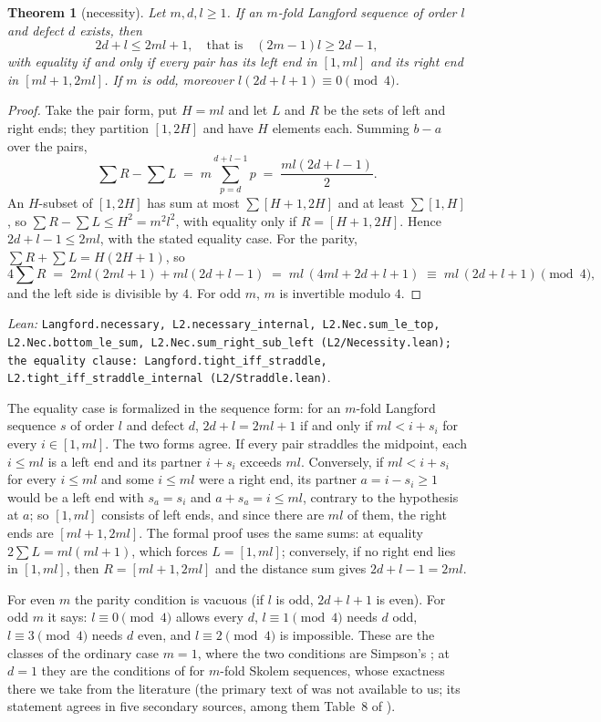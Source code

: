 \documentclass[11pt]{amsart}
\theoremstyle{plain}
\newtheorem{theorem}{Theorem}[section]
\theoremstyle{definition}
\theoremstyle{remark}
\newcommand{\lean}[1]{\par\smallskip
  {\small\raggedright\noindent\textit{Lean:} \texttt{#1}.\par}\smallskip}
\begin{document}
\begin{theorem}[necessity]\label{thm:nec}
Let $m, d, l \ge 1$. If an $m$-fold Langford sequence of order $l$ and defect $d$ exists,
then
\[
  2d + l \le 2ml + 1, \quad\text{that is}\quad (2m-1)l \ge 2d-1,
\]
with equality if and only if every pair has its left end in $[1,ml]$ and its right end in
$[ml+1,2ml]$. If $m$ is odd, moreover $l(2d+l+1) \equiv 0 \pmod 4$.
\end{theorem}

\begin{proof}
Take the pair form, put $H = ml$ and let $L$ and $R$ be the sets of left and right ends;
they partition $[1,2H]$ and have $H$ elements each. Summing $b - a$ over the pairs,
\[
  \sum R - \sum L \;=\; m \sum_{p=d}^{d+l-1} p \;=\; \frac{ml(2d+l-1)}{2}.
\]
An $H$-subset of $[1,2H]$ has sum at most $\sum[H+1,2H]$ and at least $\sum[1,H]$, so
$\sum R - \sum L \le H^2 = m^2l^2$, with equality only if $R = [H+1,2H]$. Hence
$2d + l - 1 \le 2ml$, with the stated equality case. For the parity,
$\sum R + \sum L = H(2H+1)$, so
\[
  4 \sum R \;=\; 2ml(2ml+1) + ml(2d+l-1) \;=\; ml\,(4ml + 2d + l + 1)
  \;\equiv\; ml\,(2d+l+1) \pmod 4,
\]
and the left side is divisible by $4$. For odd $m$, $m$ is invertible modulo $4$.
\end{proof}
\lean{Langford.necessary, L2.necessary\_internal, L2.Nec.sum\_le\_top,
L2.Nec.bottom\_le\_sum, L2.Nec.sum\_right\_sub\_left (L2/Necessity.lean); the equality
clause: Langford.tight\_iff\_straddle, L2.tight\_iff\_straddle\_internal (L2/Straddle.lean)}

The equality case is formalized in the sequence form: for an $m$-fold Langford sequence
$s$ of order $l$ and defect $d$, $2d + l = 2ml + 1$ if and only if $ml < i + s_i$ for
every $i \in [1,ml]$. The two forms agree. If every pair straddles the midpoint, each
$i \le ml$ is a left end and its partner $i + s_i$ exceeds $ml$. Conversely, if
$ml < i + s_i$ for every $i \le ml$ and some $i \le ml$ were a right end, its partner
$a = i - s_i \ge 1$ would be a left end with $s_a = s_i$ and $a + s_a = i \le ml$,
contrary to the hypothesis at $a$; so $[1,ml]$ consists of left ends, and since there are $ml$ of them, the right ends are
$[ml+1,2ml]$. The formal proof uses the same sums: at equality $2\sum L = ml(ml+1)$,
which forces $L = [1,ml]$; conversely, if no right end lies in $[1,ml]$, then
$R = [ml+1,2ml]$ and the distance sum gives $2d + l - 1 = 2ml$.

For even $m$ the parity condition is vacuous (if $l$ is odd, $2d + l + 1$ is even). For
odd $m$ it says: $l \equiv 0 \pmod 4$ allows every $d$, $l \equiv 1 \pmod 4$ needs $d$
odd, $l \equiv 3 \pmod 4$ needs $d$ even, and $l \equiv 2 \pmod 4$ is impossible. These
are the classes of the ordinary case $m = 1$, where the two conditions are Simpson's
\cite{Simpson}; at $d = 1$ they are the conditions of \cite{BNSS} for $m$-fold Skolem
sequences, whose exactness there we take from the literature (the primary text of
\cite{BNSS} was not available to us; its statement agrees in five secondary sources,
among them Table~8 of \cite{ADH}).
\end{document}
